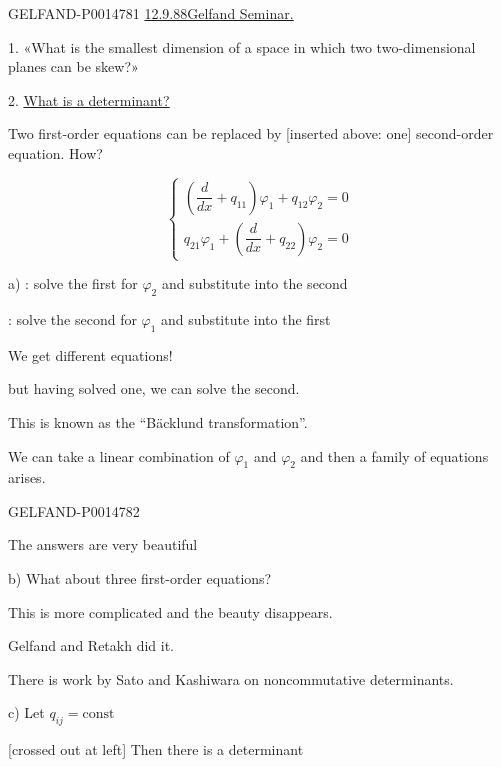 \begin{GelfandAdjacentEvidence}{GELFAND-P001478}{1}
\underline{12.9.88}\qquad \underline{\underline{Gelfand Seminar.}}

1. «What is the smallest dimension of a space in which two two-dimensional planes can be skew?»

2. \underline{\underline{What is a determinant?}}

Two first-order equations can be replaced by [inserted above: one] second-order equation. How?

\begin{equation*}
\begin{cases}
\left(\dfrac{d}{dx}+q_{11}\right)\varphi_1+q_{12}\varphi_2=0\\
q_{21}\varphi_1+\left(\dfrac{d}{dx}+q_{22}\right)\varphi_2=0
\end{cases}
\tag{1}
\end{equation*}

a) : solve the first for \(\varphi_2\) and substitute into the second

: solve the second for \(\varphi_1\) and substitute into the first

We get different equations!

but having solved one, we can solve the second.

This is known as the “Bäcklund transformation”.

We can take a linear combination of \(\varphi_1\) and \(\varphi_2\) and then a family of equations arises.
\end{GelfandAdjacentEvidence}
\begin{GelfandAdjacentEvidence}{GELFAND-P001478}{2}


The answers are very beautiful

b) What about three first-order equations?

This is more complicated and the beauty disappears.

Gelfand and Retakh did it.

There is work by Sato and Kashiwara on noncommutative determinants.

c) Let \(q_{ij}=\mathrm{const}\)

[crossed out at left] Then there is a determinant
\end{GelfandAdjacentEvidence}

